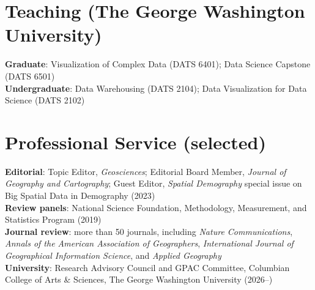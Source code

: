 \documentclass[11pt, a4paper]{article}
\begin{document}
\section*{Teaching (The George Washington University)}
\textbf{Graduate}: Visualization of Complex Data (DATS 6401); Data Science Capstone (DATS 6501)\\
\textbf{Undergraduate}: Data Warehousing (DATS 2104); Data Visualization for Data Science (DATS 2102)

\section*{Professional Service (selected)}
\textbf{Editorial}: Topic Editor, \textit{Geosciences}; Editorial Board Member, \textit{Journal of Geography and Cartography}; Guest Editor, \textit{Spatial Demography} special issue on Big Spatial Data in Demography (2023)\\
\textbf{Review panels}: National Science Foundation, Methodology, Measurement, and Statistics Program (2019)\\
\textbf{Journal review}: more than 50 journals, including \textit{Nature Communications}, \textit{Annals of the American Association of Geographers}, \textit{International Journal of Geographical Information Science}, and \textit{Applied Geography}\\
\textbf{University}: Research Advisory Council and GPAC Committee, Columbian College of Arts \& Sciences, The George Washington University (2026--)
\end{document}
